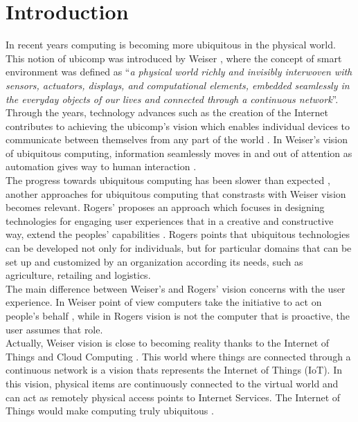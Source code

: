 \section{Introduction}
\label{sec:introduction}
In recent years computing is becoming more ubiquitous in the physical world. This
notion of ubicomp was introduced by Weiser \cite{weiser1999origins}, where the concept of
smart environment was defined as ``\textit{a physical world richly and invisibly
interwoven with sensors, actuators, displays, and computational elements, embedded
seamlessly in the everyday objects of our lives and connected through a continuous network}''.
Through the years, technology advances such as the creation of the Internet contributes
to achieving the ubicomp's vision which enables individual devices to communicate between
themselves from any part of the world \cite{gubbi2013internet}. In Weiser's vision of
ubiquitous computing, information seamlessly moves in and out of attention as automation
gives way to human interaction \cite{weiser1991computer}.\\

The progress towards ubiquitous computing has been slower than expected \cite{greenfield2010everyware},
another approaches for ubiquitous computing that constrasts with Weiser vision becomes relevant.
Rogers' proposes an approach which focuses in designing technologies for engaging user
experiences that in a creative and constructive way, extend the peoples' capabilities \cite{rogers2006moving}.
Rogers points that ubiquitous technologies can be developed not only for individuals,
but for particular domains that can be set up and customized by an organization according
its needs, such as agriculture, retailing and logistics.\\

The main difference between Weiser's and Rogers' vision concerns with the user experience.
In Weiser point of view computers take the initiative to act on people's behalf \cite{tennenhouse2000proactive},
while in Rogers vision is not the computer that is proactive, the user assumes that role.\\

Actually, Weiser vision is close to becoming reality thanks to the Internet of Things
and Cloud Computing \cite{caceres2012ubicomp}. This world where things are connected
through a continuous network is a vision thats represents the Internet of Things (IoT).
In this vision, physical items are continuously connected to the virtual world and can
act as remotely physical access points to Internet Services. The Internet of Things would
make computing truly ubiquitous \cite{mattern2010internet}.\\

